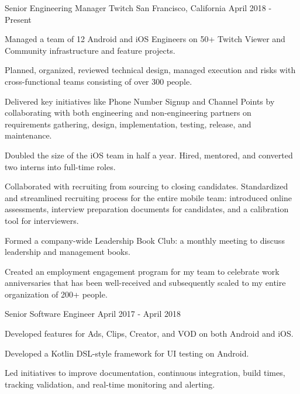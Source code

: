 

\begin{cventries}

  \cventry
    {Senior Engineering Manager} %
    {Twitch} %
    {San Francisco, California} %
    {April 2018 - Present} %
    {
	\begin{cvitems} %
	\item Managed a team of 12 Android and iOS Engineers on 50+ Twitch Viewer and Community infrastructure and feature projects.
	\item Planned, organized, reviewed technical design, managed execution and risks with cross-functional teams consisting of over 300 people.
	\item Delivered key initiatives like Phone Number Signup and Channel Points by collaborating with both engineering and non-engineering partners on requirements gathering, design, implementation, testing, release, and maintenance.
	\item Doubled the size of the iOS team in half a year. Hired, mentored, and converted two interns into full-time roles.
	\item Collaborated with recruiting from sourcing to closing candidates. Standardized and streamlined recruiting process for the entire mobile team: introduced online assessments, interview preparation documents for candidates, and a calibration tool for interviewers.
	\item Formed a company-wide Leadership Book Club: a monthly meeting to discuss leadership and management books.
	\item Created an employment engagement program for my team to celebrate work anniversaries that has been well-received and subsequently scaled to my entire organization of 200+ people.
	\end{cvitems}
    }
    
  \cventry
    {Senior Software Engineer} %
    {} %
    {} %
    {April 2017 - April 2018} %
    {
	\begin{cvitems} %
      	\item Developed features for Ads, Clips, Creator, and VOD on both Android and iOS.
      	\item Developed a Kotlin DSL-style framework for UI testing on Android. 
      	\item Led initiatives to improve documentation, continuous integration, build times, tracking validation, and real-time monitoring and alerting.
	\end{cvitems}
    }


\end{cventries}

